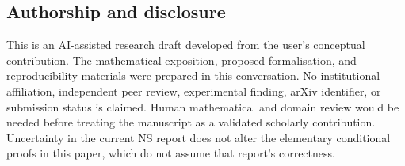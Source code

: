 \documentclass[11pt,a4paper]{article}
\theoremstyle{definition}
\theoremstyle{remark}
\begin{document}
\subsection*{Authorship and disclosure}
This is an AI-assisted research draft developed from the user's conceptual contribution. The mathematical exposition, proposed formalisation, and reproducibility materials were prepared in this conversation. No institutional affiliation, independent peer review, experimental finding, arXiv identifier, or submission status is claimed. Human mathematical and domain review would be needed before treating the manuscript as a validated scholarly contribution. Uncertainty in the current NS report does not alter the elementary conditional proofs in this paper, which do not assume that report's correctness.


\end{document}
